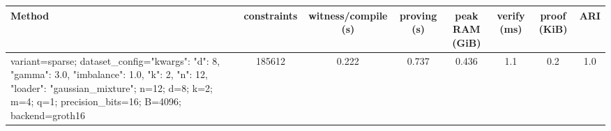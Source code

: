 \begin{tabular}{lccccccc}
\toprule
Method & constraints & witness/compile (s) & proving (s) & peak RAM (GiB) & verify (ms) & proof (KiB) & ARI \\
\midrule
variant=sparse; dataset\_config={"kwargs": {"d": 8, "gamma": 3.0, "imbalance": 1.0, "k": 2, "n": 12}, "loader": "gaussian\_mixture"}; n=12; d=8; k=2; m=4; q=1; precision\_bits=16; B=4096; backend=groth16 & 185612 & 0.222 & 0.737 & 0.436 & 1.1 & 0.2 & 1.0 \\
\bottomrule
\end{tabular}
